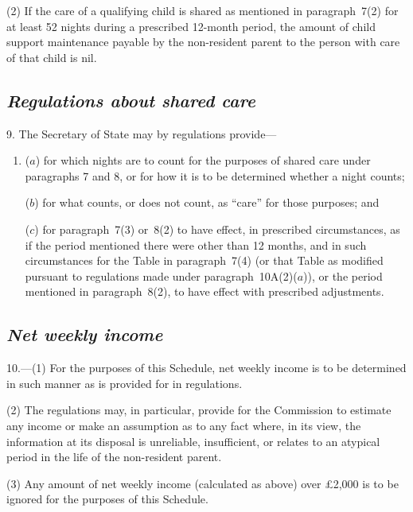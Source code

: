 \documentclass[12pt,a4paper]{article}
\begin{document}
(2) If the care of a qualifying child is shared as mentioned in paragraph~7(2)  for at least 52 nights during a prescribed 12-month period, the amount of child support maintenance payable by the non-resident parent to the person with care of that child is nil.

\subsection*{\itshape Regulations about shared care}

9. The Secretary of State may by regulations provide—
\begin{enumerate}\item[]
($a$) for which nights are to count for the purposes of shared care under paragraphs 7 and 8, or for how it is to be determined whether a night counts;

($b$) for what counts, or does not count, as “care” for those purposes; and

($c$) for paragraph~7(3)  or~8(2)  to have effect, in prescribed circumstances, as if the period mentioned there were other than 12 months, and in such circumstances for the Table in paragraph~7(4)  (or that Table as modified pursuant to regulations made under paragraph~10A(2)($a$)), or the period mentioned in paragraph~8(2), to have effect with prescribed adjustments.
\end{enumerate}

\subsection*{\itshape Net weekly income}

10.---(1) For the purposes of this Schedule, net weekly income is to be determined in such manner as is provided for in regulations.

(2) The regulations may, in particular, provide for the 
Commission  %
to estimate any income or make an assumption as to any fact where, in 
its  %
view, the information at 
its  %
disposal is unreliable, insufficient, or relates to an atypical period in the life of the non-resident parent.

(3) Any amount of net weekly income (calculated as above) over £2,000 is to be ignored for the purposes of this Schedule.

\end{document}
